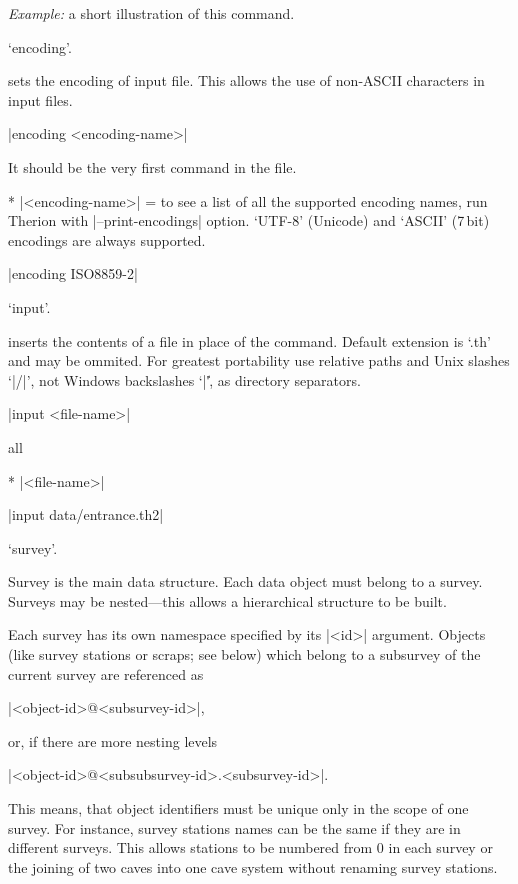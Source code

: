 {\it Example:} a short illustration of this command.




\subsubchapter `encoding'.

\description
  sets the encoding of input file. This allows the use of non-ASCII characters
  in input files.
\enddescription

\syntax
  |encoding <encoding-name>|
\endsyntax

\context
  It should be the very first command in the file.
\endcontext

\arguments
* |<encoding-name>| = to see a list of all the supported encoding names, run Therion with 
  |--print-encodings| option. `UTF-8' (Unicode) and `ASCII' (7\,bit) encodings 
  are always supported.
\endarguments

\example
  |encoding ISO8859-2|
\endexample



\subsubchapter `input'.

\description
  inserts the contents of a file in place of 
  the command. Default extension is `.th' and may be ommited. For greatest 
  portability use relative paths and Unix slashes `|/|', not Windows 
  backslashes `|\|', as 
  directory separators.
\enddescription

\syntax
  |input <file-name>|
\endsyntax

\context
  all
\endcontext

\arguments
*  |<file-name>|
\endarguments

\example
  |input data/entrance.th2|
\endexample



\subsubchapter `survey'.

\description
  Survey is the main data structure. Each data object must belong to a 
  survey. Surveys may be nested---this allows a hierarchical structure 
  to be built. 

  Each survey has its own namespace specified by its |<id>| argument. Objects 
  (like survey stations or scraps; see below) which belong to a subsurvey of 
  the current survey are referenced as
  
  |<object-id>@<subsurvey-id>|,
  
  or, if there are more nesting levels
  
  |<object-id>@<subsubsurvey-id>.<subsurvey-id>|.
  
  This means, that object identifiers must be unique only in the scope of one 
  survey. For instance, survey stations names can be the same if they are 
  in different surveys. This allows stations to be numbered from 0 in each survey or 
  the joining of two caves into one cave system without renaming survey stations.

